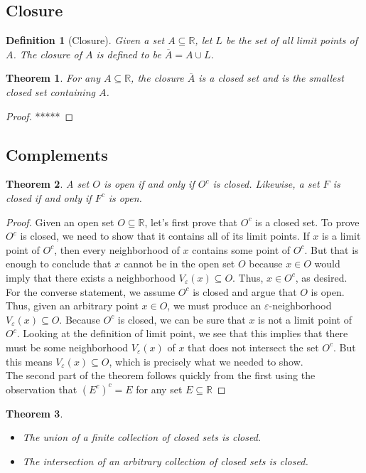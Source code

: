 \documentclass[10pt]{report}
\newtheorem{thm3}{Theorem}[subsection]
\newtheorem{def3}{Definition}[subsection]
\newcommand{\eps}{\varepsilon}
\begin{document}
\subsection{Closure}
\begin{def3}[Closure]
Given a set $A\subseteq\mathbb{R}$, let $L$ be the set of all limit points of $A$. The closure of $A$ is defined to be $\overline{A}=A\cup L$.
\end{def3}
\begin{thm3}
For any $A\subseteq\mathbb{R}$, the closure $\overline{A}$ is a closed set and is the smallest closed set containing $A$.
\end{thm3}
\begin{proof}
*****
\end{proof}
\subsection{Complements}
\begin{thm3}
A set $O$ is open if and only if $O^c$ is closed. Likewise, a set $F$ is closed if and only if $F^c$ is open.
\end{thm3}
\begin{proof}
Given an open set $O\subseteq \mathbb{R}$, let's first prove that $O^c$ is a closed set. To prove $O^c$ is closed, we need to show that it contains all of its limit points. If $x$ is a limit point of $O^c$, then every neighborhood of $x$ contains some point of $O^c$. But that is enough to conclude that $x$ cannot be in the open set $O$ because $x\in O$ would imply that there exists a neighborhood $V_\eps (x)\subseteq O$. Thus, $x\in O^c$, as desired.\\
For the converse statement, we assume $O^c$ is closed and argue that $O$ is open. Thus, given an arbitrary point $x\in O$, we must produce an $\eps$-neighborhood $V_\eps(x)\subseteq O$. Because $O^c$ is closed, we can be sure that $x$ is not a limit point of $O^c$. Looking at the definition of limit point, we see that this implies that there must be some neighborhood $V_\eps (x)$ of $x$ that does not intersect the set $O^c$. But this means $V_\eps(x)\subseteq O$, which is precisely what we needed to show.\\
The second part of the theorem follows quickly from the first using the observation that $(E^c)^c=E$ for any set $E\subseteq\mathbb{R}$
\end{proof}
\begin{thm3}
\begin{itemize}
\item[(i)] The union of a finite collection of closed sets is closed.
\item[(ii)] The intersection of an arbitrary collection of closed sets is closed.
\end{itemize}
\end{thm3}
\end{document}

